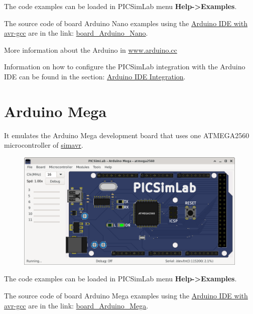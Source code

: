 
The code examples can be loaded in PICSimLab menu \textbf{Help->Examples}.

The source code of board Arduino Nano examples using the 
\href{https://www.arduino.cc/en/Main/Software}{Arduino IDE with avr-gcc} are in the link: 
\href{https://lcgamboa.github.io/picsimlab_examples/board_Arduino_Nano.html}{board\_Arduino\_Nano}.

More information about the Arduino in \href{https://www.arduino.cc/}{www.arduino.cc}

Information on how to configure the PICSimLab integration with the Arduino IDE can be found in the 
section: \hyperlink{def:arduinoide}{Arduino IDE Integration}.

\section{Arduino Mega}

It emulates the Arduino Mega development board that uses one ATMEGA2560 microcontroller of \href{https://github.com/buserror/simavr}{simavr}.

\begin{figure}[H]
\center
\includegraphics[width=0.99\textwidth]{img/boardAMega.png} 
\end{figure} 


The code examples can be loaded in PICSimLab menu \textbf{Help->Examples}.

The source code of board Arduino Mega examples using the 
\href{https://www.arduino.cc/en/Main/Software}{Arduino IDE with avr-gcc} are in the link: 
\href{https://lcgamboa.github.io/picsimlab_examples/board_Arduino_Mega.html}{board\_Arduino\_Mega}.

